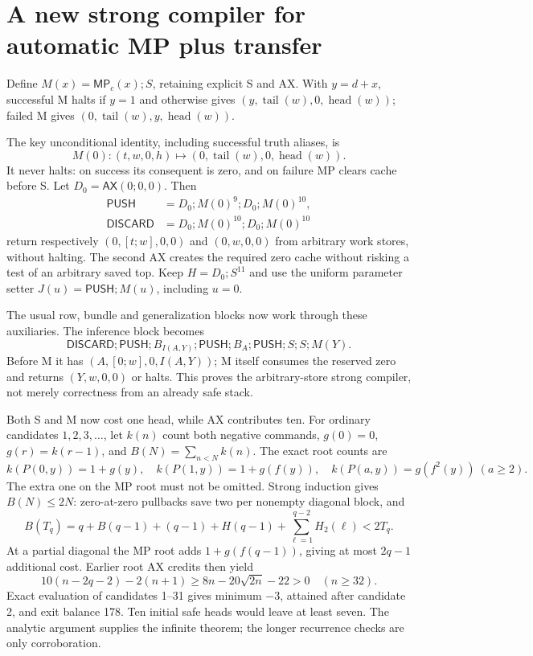 \documentclass[11pt]{article}
\newcommand{\MP}{\mathsf{MP}}
\newcommand{\AX}{\mathsf{AX}}
\newcommand{\PUSH}{\mathsf{PUSH}}
\newcommand{\DISCARD}{\mathsf{DISCARD}}
\begin{document}
\section{A new strong compiler for automatic MP plus transfer}
Define $M(x)=\MP_c(x);S$, retaining explicit S and AX. With $y=d+x$, successful M halts if $y=1$ and otherwise gives $(y,\operatorname{tail}(w),0,\operatorname{head}(w))$; failed M gives $(0,\operatorname{tail}(w),y,\operatorname{head}(w))$.

The key unconditional identity, including successful truth aliases, is
\[
 M(0):(t,w,0,h)\longmapsto(0,\operatorname{tail}(w),0,\operatorname{head}(w)).
\]
It never halts: on success its consequent is zero, and on failure MP clears cache before S. Let $D_0=\AX(0;0,0)$. Then
\begin{align*}
 \PUSH&=D_0;M(0)^9;D_0;M(0)^{10},\\
 \DISCARD&=D_0;M(0)^{10};D_0;M(0)^{10}
\end{align*}
return respectively $(0,[t;w],0,0)$ and $(0,w,0,0)$ from arbitrary work stores, without halting. The second AX creates the required zero cache without risking a test of an arbitrary saved top. Keep $H=D_0;S^{11}$ and use the uniform parameter setter $J(u)=\PUSH;M(u)$, including $u=0$.

The usual row, bundle and generalization blocks now work through these auxiliaries. The inference block becomes
\[
 \DISCARD;\PUSH;B_{I(A,Y)};\PUSH;B_A;\PUSH;S;S;M(Y).
\]
Before M it has $(A,[0;w],0,I(A,Y))$; M itself consumes the reserved zero and returns $(Y,w,0,0)$ or halts. This proves the arbitrary-store strong compiler, not merely correctness from an already safe stack.

Both S and M now cost one head, while AX contributes ten. For ordinary candidates $1,2,3,\ldots$, let $k(n)$ count both negative commands, $g(0)=0$, $g(r)=k(r-1)$, and $B(N)=\sum_{n<N}k(n)$. The exact root counts are
\[
 k(P(0,y))=1+g(y),\quad k(P(1,y))=1+g(f(y)),\quad
 k(P(a,y))=g(f^2(y))\ (a\ge2).
\]
The extra one on the MP root must not be omitted. Strong induction gives $B(N)\le2N$: zero-at-zero pullbacks save two per nonempty diagonal block, and
\[
 B(T_q)=q+B(q-1)+(q-1)+H(q-1)+\sum_{\ell=1}^{q-2}H_2(\ell)
 <2T_q.
\]
At a partial diagonal the MP root adds $1+g(f(q-1))$, giving at most $2q-1$ additional cost. Earlier root AX credits then yield
\[
 10(n-2q-2)-2(n+1)\ge8n-20\sqrt{2n}-22>0\quad(n\ge32).
\]
Exact evaluation of candidates 1--31 gives minimum $-3$, attained after candidate 2, and exit balance 178. Ten initial safe heads would leave at least seven. The analytic argument supplies the infinite theorem; the longer recurrence checks are only corroboration.
\end{document}
